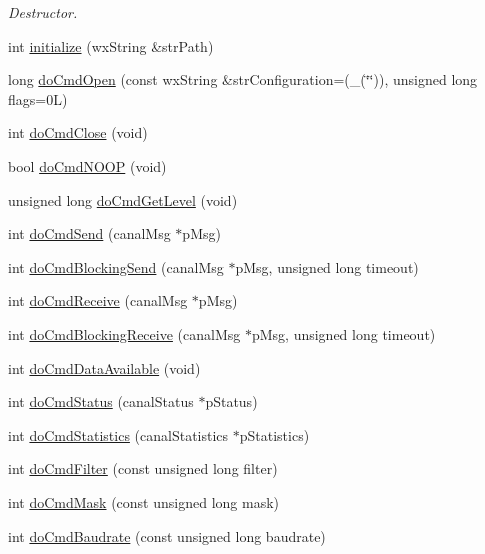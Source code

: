\begin{DoxyCompactItemize}
\begin{DoxyCompactList}\small\item\em Destructor. \end{DoxyCompactList}\item 
int \hyperlink{class_c_dll_wrapper_ab23fffe0581a1bc430bcd60fffd81645}{initialize} (wxString \&strPath)
\item 
long \hyperlink{class_c_dll_wrapper_ab4c5118b9ee0d02399a0faa12a3c1556}{doCmdOpen} (const wxString \&strConfiguration=(\_\-(\char`\"{}\char`\"{})), unsigned long flags=0L)
\item 
int \hyperlink{class_c_dll_wrapper_a8508e6c901500c0a96dffd627a58127f}{doCmdClose} (void)
\item 
bool \hyperlink{class_c_dll_wrapper_a2972e1797460d3c2eeb3cabd66f5842c}{doCmdNOOP} (void)
\item 
unsigned long \hyperlink{class_c_dll_wrapper_a8273a1037a6ede0a2e7ea71cd0b1d30f}{doCmdGetLevel} (void)
\item 
int \hyperlink{class_c_dll_wrapper_a2fcdc5f6fdb9089dfb34a94914eb513c}{doCmdSend} (canalMsg $\ast$pMsg)
\item 
int \hyperlink{class_c_dll_wrapper_a3119649c7c8eff493f2a84cdfd87c3b2}{doCmdBlockingSend} (canalMsg $\ast$pMsg, unsigned long timeout)
\item 
int \hyperlink{class_c_dll_wrapper_ab9ecc6001b864f751ac4cdce8f02bf08}{doCmdReceive} (canalMsg $\ast$pMsg)
\item 
int \hyperlink{class_c_dll_wrapper_aa05b4abb7a676fa453285ee9ecb9cb0e}{doCmdBlockingReceive} (canalMsg $\ast$pMsg, unsigned long timeout)
\item 
int \hyperlink{class_c_dll_wrapper_ae68f837b448c3b2b2d906a476952033e}{doCmdDataAvailable} (void)
\item 
int \hyperlink{class_c_dll_wrapper_afc54763410f122eb1a57f593325449aa}{doCmdStatus} (canalStatus $\ast$pStatus)
\item 
int \hyperlink{class_c_dll_wrapper_ac1106b4d474d0185387e3f37d71362ad}{doCmdStatistics} (canalStatistics $\ast$pStatistics)
\item 
int \hyperlink{class_c_dll_wrapper_a2ed6ae4f31b4c6b9fe234e275b9c1e11}{doCmdFilter} (const unsigned long filter)
\item 
int \hyperlink{class_c_dll_wrapper_abc8460a4e3708c54c1cd18bd672b41be}{doCmdMask} (const unsigned long mask)
\item 
int \hyperlink{class_c_dll_wrapper_afd53734e642b770e4b5f29df69dab5db}{doCmdBaudrate} (const unsigned long baudrate)
\item 

\end{DoxyCompactItemize}
